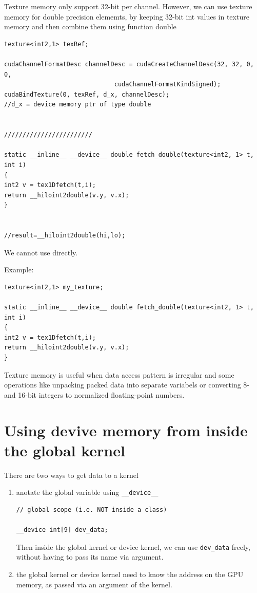 Texture memory only support 32-bit per channel. However, we can use texture
memory for double precision elememts, by keeping 32-bit int values in texture
memory and then combine them using function double
\begin{lstlisting}
texture<int2,1> texRef;

cudaChannelFormatDesc channelDesc = cudaCreateChannelDesc(32, 32, 0, 0,
                              cudaChannelFormatKindSigned);
cudaBindTexture(0, texRef, d_x, channelDesc);
//d_x = device memory ptr of type double


////////////////////////

static __inline__ __device__ double fetch_double(texture<int2, 1> t, int i)
{
int2 v = tex1Dfetch(t,i);
return __hiloint2double(v.y, v.x);
}


//result=__hiloint2double(hi,lo);
\end{lstlisting}
We cannot use directly.

Example:
\begin{lstlisting}
texture<int2,1> my_texture;

static __inline__ __device__ double fetch_double(texture<int2, 1> t, int i)
{
int2 v = tex1Dfetch(t,i);
return __hiloint2double(v.y, v.x);
}
\end{lstlisting}

Texture memory is useful when data access pattern is irregular
and some operations like unpacking packed data into separate variabels or
converting 8- and 16-bit integers to normalized floating-point numbers. 

\section{Using devive memory from inside the global kernel}


There are two ways to get data to a kernel
\begin{enumerate}
  \item anotate the global variable using \verb!__device__! 

\begin{lstlisting}
// global scope (i.e. NOT inside a class)

__device int[9] dev_data;
\end{lstlisting}  
Then inside the global kernel or device kernel, we can use \verb!dev_data! freely, without having to pass
its name via argument.
  
  \item the global kernel or device kernel need to know the address on the GPU memory,
  as passed via an argument of the kernel.

\end{enumerate}


